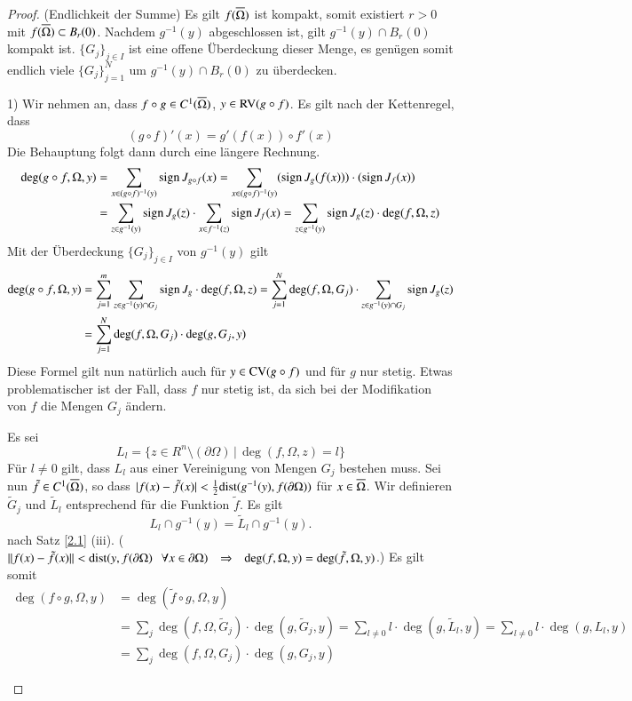 \begin{proof}
    (Endlichkeit der Summe) Es gilt $f(\overline\Omega)$ ist kompakt, somit existiert $r>0$ mit $f(\overline \Omega)
    \subset B_r(0)$. Nachdem $g^{-1}(y)$ abgeschlossen ist, gilt $g^{-1}(y)\cap B_r(0)$ kompakt ist.
    $\{G_j\}_{j\in I}$ ist eine offene Überdeckung dieser Menge, es genügen somit endlich viele $\{  
    G_j \}_{j=1}^N$ um $g^{-1}(y)\cap B_r(0)$ zu überdecken.
    \begin{description}
    \item{1)}
    Wir nehmen an, dass $f\circ g\in C^1(\overline \Omega)$, $y\in \mathrm{RV}(g\circ f)$. Es gilt nach der
    Kettenregel, dass
    \[
        (g\circ f)'(x)=g'(f(x))\circ f'(x)
    \]
    Die Behauptung folgt dann durch eine längere Rechnung.
    \begin{align*}
        \deg(g\circ f,\Omega,y)&=\sum_{x\in(g\circ f)^{-1}(y)}\mathrm{sign}\, J_{g\circ f}(x)=\sum_{x\in (g\circ f)
        ^{-1} (y)}(\mathrm{sign}\, J_g(f(x)))\cdot(\mathrm{sign}\, J_f(x))\\
        &= \sum_{z\in g^{-1}(y)} \mathrm{sign}\, J_g(z)\cdot \sum_{x\in f^{-1}(z)} \mathrm{sign}\, J_f(x)
        =\sum_{z\in g^{-1}(y)} \mathrm{sign}\, J_g(z)\cdot \deg(f,\Omega,z)
    \end{align*}
    Mit der Überdeckung $\{G_j\}_{j\in I}$ von $g^{-1}(y)$ gilt
    \begin{align*}
        \deg(g\circ f,\Omega,y)&=\sum_{j=1}^m\sum_{z\in g^{-1}(y)\cap G_j}\mathrm{sign}\, J_g\cdot \deg(f,\Omega,z)
        =\sum_{j=1}^N \deg(f,\Omega,G_j) \cdot \sum_{z\in g^{-1}(y)\cap G_j} \mathrm{sign}\, J_g(z)\\
        &= \sum_{j=1}^N \deg(f,\Omega,G_j)\cdot \deg(g,G_j,y)
    \end{align*}
    Diese Formel gilt nun natürlich auch für $y\in \mathrm{CV}(g\circ f)$ und für $g$ nur stetig. Etwas
    problematischer ist der Fall, dass $f$ nur stetig ist, da sich bei der Modifikation von $f$ die
    Mengen $G_j$ ändern.

    Es sei
    \[
        L_l=\{z\in R^n\setminus(\partial \Omega)\, | \, \deg(f,\Omega,z)=l\}
    \]
    Für $l\neq 0$ gilt, dass $L_l$ aus einer Vereinigung von Mengen $G_j$ bestehen muss. Sei nun
    $\tilde f\in C^1 (\overline \Omega)$, so dass $|f(x)-\tilde f(x)|< \frac 12 \mathrm{dist}(g^{-1}(y),
    f(\partial\Omega))$ für $x\in \overline \Omega$. Wir definieren $\tilde G_j$ und $\tilde L_l$ entsprechend
    für die Funktion $\tilde f$.
    Es gilt
    \[
        L_l\cap g^{-1}(y)=\tilde L_l\cap g^{-1}(y).
    \]
    nach Satz \ref{2.1} (iii). ($\|f(x)-\tilde f(x)\|<\mathrm{dist}(y,f(\partial \Omega)\hspace{.25cm} \forall
    x\in \partial \Omega)\hspace{.25cm} \Rightarrow \hspace{.25cm} \deg(f,\Omega,y)=\deg(\tilde f,\Omega,y)$.) Es gilt somit
    \begin{align*}
        \deg(f\circ g, \Omega, y)&=\deg(\tilde f\circ g,\Omega,y)\\
        &=\sum_{j}\deg(f,\Omega,\tilde G_j)\cdot \deg(g,\tilde G_j,y)=\sum_{l\neq0} l\cdot\deg( g,\tilde
        L_l,y)=\sum_{l\neq 0} l\cdot \deg(g,L_l,y)\\
        &=\sum_j \deg(f,\Omega,G_j)\cdot \deg(g,G_j,y)
    \end{align*}
    \end{description}
    \[  \]
\end{proof}

